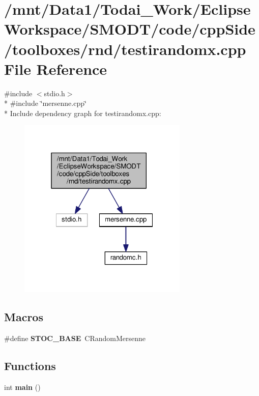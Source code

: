 \section{/mnt/\-Data1/\-Todai\-\_\-\-Work/\-Eclipse\-Workspace/\-S\-M\-O\-D\-T/code/cpp\-Side/toolboxes/rnd/testirandomx.cpp File Reference}
\label{toolboxes_2rnd_2testirandomx_8cpp}
{\ttfamily \#include $<$stdio.\-h$>$}\\*
{\ttfamily \#include \char`\"{}mersenne.\-cpp\char`\"{}}\\*
Include dependency graph for testirandomx.\-cpp\-:
\nopagebreak
\begin{figure}[H]
\begin{center}
\leavevmode
\includegraphics[width=229pt]{toolboxes_2rnd_2testirandomx_8cpp__incl}
\end{center}
\end{figure}
\subsection*{Macros}
\begin{DoxyCompactItemize}
\item 
\#define {\bf S\-T\-O\-C\-\_\-\-B\-A\-S\-E}~C\-Random\-Mersenne
\end{DoxyCompactItemize}
\subsection*{Functions}
\begin{DoxyCompactItemize}
\item 
int {\bf main} ()
\end{DoxyCompactItemize}


